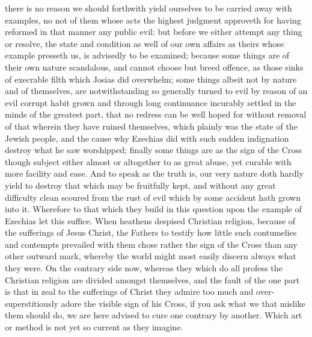  there is no reason we should forthwith yield ourselves to be carried away with examples, no not of them whose acts the highest judgment approveth for having reformed in that manner any public evil: but before we either attempt any thing or resolve, the state and condition as well of our own affairs as theirs whose example presseth us, is advisedly to be examined; because some things are of their own nature scandalous, and cannot choose but breed offence, as those sinks of execrable filth which Josias did overwhelm; some things albeit not by nature and of themselves, are notwithstanding so generally turned to evil by reason of an evil corrupt habit grown and through long continuance incurably settled in the minds of the greatest part, that no redress can be well hoped for without removal of that wherein they have ruined themselves, which plainly was the state of the Jewish people, and the cause why Ezechias did with such sudden indignation destroy what he saw worshipped; finally some things are as the sign of the Cross though subject either almost or altogether to as great abuse, yet curable with more facility and ease. And to speak as the truth is, our very nature doth hardly yield to destroy that which may be fruitfully kept, and without any great difficulty clean scoured from the rust of evil which by some accident hath grown into it. Wherefore to that which they build in this question upon the example of Ezechias let this suffice.
When heathens despised Christian religion, because of the sufferings of Jesus Christ, the Fathers to testify how little such contumelies and contempts prevailed with them chose rather the sign of the Cross than any other outward mark, whereby the world might most easily discern always what they were. On the contrary side now, whereas they which do all profess the Christian religion are divided amongst themselves, and the fault of the one part is that in zeal to the sufferings of Christ they admire too much and over-superstitiously adore the visible sign of his Cross, if you ask what we that mislike them should do, we are here advised to cure one contrary by another. Which art or method is not yet so current as they imagine.
